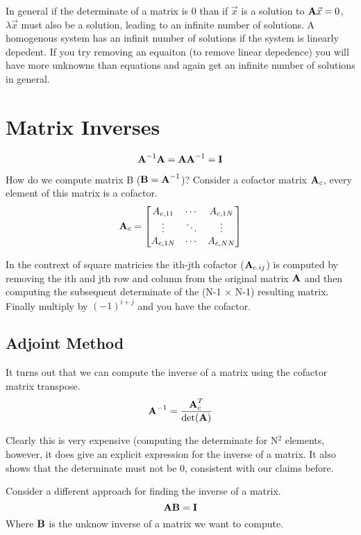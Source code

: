 \documentclass{article}
\newcommand{\be}{\begin{equation}}
\newcommand{\ee}{\end{equation}}
\newcommand{\bA}{\mbox{\bf A}}
\newcommand{\bB}{\mbox{\bf B}}
\newcommand{\bI}{\mbox{\bf I}}
\begin{document}
In general if the determinate of a matrix is 0 than if $\vec{x}$ is a solution to $\bA\vec{x}=0$, $\lambda\vec{x}$ must also be a solution, leading to an infinite number of solutions. 
A homogenous system has an infinit number of solutions if the system is linearly depedent. 
If you try removing an equaiton (to remove linear depedence) you will have more unknowns than equations and again get an infinite number of solutions in general. 

\section{Matrix Inverses}
\be
\bA^{-1}\bA =\bA\bA^{-1} = \bI
\ee

How do we compute matrix B ($\bB=\bA^{-1}$)?
Consider a cofactor matrix $\bA_c$, every element of this matrix is a cofactor. 
\be
\bA_c =  
\begin{bmatrix}
    A_{c,11}  & \dotsb &  A_{c,1N} \\
    \vdots  & \ddots &  \vdots \\
    A_{c,1N}  & \dotsb &  A_{c,NN} 
\end{bmatrix}
\ee

In the contrext of square matricies the ith-jth cofactor ($\bA_{c.ij}$) is computed by removing the ith and jth row and column from the original matrix $\bA$ and then computing the subsequent determinate of the (N-1 $\times$ N-1) resulting matrix.
Finally multiply by $(-1)^{i+j}$ and you have the cofactor. 

\subsection*{Adjoint Method}
It turns out that we can compute the inverse of a matrix using the cofactor matrix transpose. 
\be
\bA^{-1} = \frac{\bA_c^{T}}{\det(\bA)}
\ee

Clearly this is very expensive (computing the determinate for N$^2$ elements, however, it does give an explicit expression for the inverse of a matrix. 
It also shows that the determinate must not be 0, consistent with our claims before. 

Consider a different approach for finding the inverse of a matrix.
\be
\bA\bB =\bI
\ee
Where $\bB$ is the unknow inverse of a matrix we want to compute. 
\end{document}
